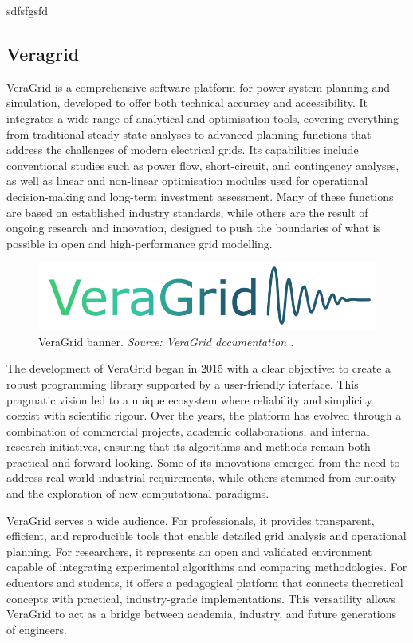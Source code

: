 sdfsfgsfd

\subsection{Veragrid}

VeraGrid is a comprehensive software platform for power system planning and simulation, developed to offer both technical accuracy and accessibility. 
It integrates a wide range of analytical and optimisation tools, covering everything from traditional steady-state analyses to advanced planning functions 
that address the challenges of modern electrical grids. Its capabilities include conventional studies such as power flow, short-circuit, and contingency analyses, 
as well as linear and non-linear optimisation modules used for operational decision-making and long-term investment assessment. Many of these functions are based on 
established industry standards, while others are the result of ongoing research and innovation, designed to push the boundaries of what is possible in open and high-performance 
grid modelling.

\begin{figure}
  \centering
  \includegraphics[width=0.8\linewidth]{figures/VeraGrid_banner.png}
  \caption{VeraGrid banner. \textit{Source: VeraGrid documentation \cite{veragrid}.}}
  \label{fig:VeraGrid_banner}
\end{figure}

The development of VeraGrid began in 2015 with a clear objective: to create a robust programming library supported by a user-friendly interface. 
This pragmatic vision led to a unique ecosystem where reliability and simplicity coexist with scientific rigour. Over the years, the platform has evolved through a combination 
of commercial projects, academic collaborations, and internal research initiatives, ensuring that its algorithms and methods remain both practical and forward-looking. 
Some of its innovations emerged from the need to address real-world industrial requirements, while others stemmed from curiosity and the exploration of new computational paradigms.

VeraGrid serves a wide audience. For professionals, it provides transparent, efficient, and reproducible tools that enable detailed grid analysis and operational planning. 
For researchers, it represents an open and validated environment capable of integrating experimental algorithms and comparing methodologies. For educators and students, 
it offers a pedagogical platform that connects theoretical concepts with practical, industry-grade implementations. This versatility allows VeraGrid to act as a bridge between 
academia, industry, and future generations of engineers.

